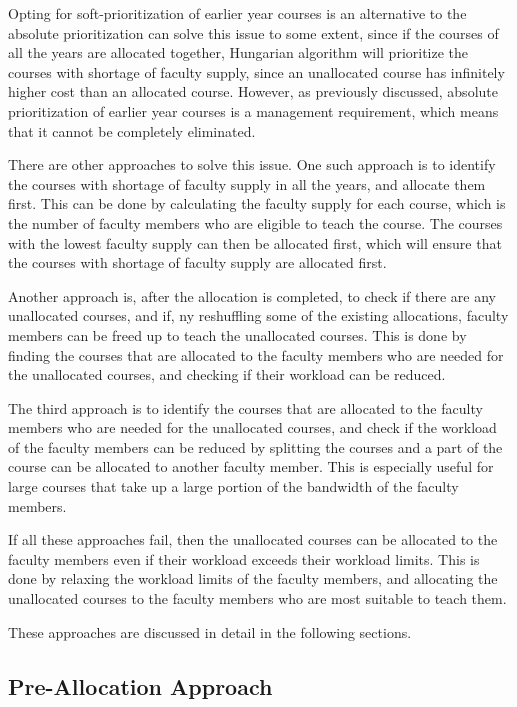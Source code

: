 Opting for soft-prioritization of earlier year courses is an alternative to the absolute prioritization can solve this issue to some extent, since if the courses of all the years are allocated together, Hungarian algorithm will prioritize the courses with shortage of faculty supply, since an unallocated course has infinitely higher cost than an allocated course. However, as previously discussed, absolute prioritization of earlier year courses is a management requirement, which means that it cannot be completely eliminated.

There are other approaches to solve this issue. One such approach is to identify the courses with shortage of faculty supply in all the years, and allocate them first. This can be done by calculating the faculty supply for each course, which is the number of faculty members who are eligible to teach the course. The courses with the lowest faculty supply can then be allocated first, which will ensure that the courses with shortage of faculty supply are allocated first.

Another approach is, after the allocation is completed, to check if there are any unallocated courses, and if, ny reshuffling some of the existing allocations, faculty members can be freed up to teach the unallocated courses. This is done by finding the courses that are allocated to the faculty members who are needed for the unallocated courses, and checking if their workload can be reduced.

The third approach is to identify the courses that are allocated to the faculty members who are needed for the unallocated courses, and check if the workload of the faculty members can be reduced by splitting the courses and a part of the course can be allocated to another faculty member. This is especially useful for large courses that take up a large portion of the bandwidth of the faculty members.

If all these approaches fail, then the unallocated courses can be allocated to the faculty members even if their workload exceeds their workload limits. This is done by relaxing the workload limits of the faculty members, and allocating the unallocated courses to the faculty members who are most suitable to teach them.

These approaches are discussed in detail in the following sections.

\subsection{Pre-Allocation Approach}
\label{sec:pre_allocation}

